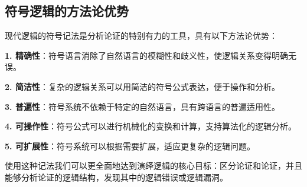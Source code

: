 \subsection{符号逻辑的方法论优势}

现代逻辑的符号记法是分析论证的特别有力的工具，具有以下方法论优势：

\begin{examplebox}[title=符号逻辑的五大优势]
\textbf{1. 精确性}：符号语言消除了自然语言的模糊性和歧义性，使逻辑关系变得明确无误。

\textbf{2. 简洁性}：复杂的逻辑关系可以用简洁的符号公式表达，便于操作和分析。

\textbf{3. 普遍性}：符号系统不依赖于特定的自然语言，具有跨语言的普遍适用性。

\textbf{4. 可操作性}：符号公式可以进行机械化的变换和计算，支持算法化的逻辑分析。

\textbf{5. 可扩展性}：符号系统可以根据需要扩展，适应更复杂的逻辑问题。
\end{examplebox}

使用这种记法我们可以更全面地达到演绎逻辑的核心目标：区分论证和论证，并且能够分析论证的逻辑结构，发现其中的逻辑错误或逻辑漏洞。

